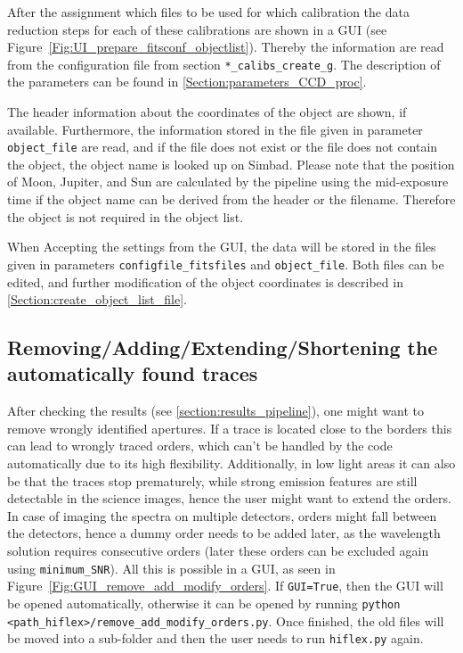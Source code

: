 \documentclass[10pt,a4paper]{article}
\begin{document}
After the assignment which files to be used for which calibration the data reduction steps for each of these calibrations are shown in a GUI (see Figure~\ref{Fig:UI_prepare_fitsconf_objectlist}). Thereby the information are read from the configuration file from section \verb|*_calibs_create_g|. The description of the parameters can be found in \ref{Section:parameters_CCD_proc}.

\noindent The header information about the coordinates of the object are shown, if available. Furthermore, the information stored in the file given in parameter \verb|object_file| are read, and if the file does not exist or the file does not contain the object, the object name is looked up on Simbad. Please note that the position of Moon, Jupiter, and Sun are calculated by the pipeline using the mid-exposure time if the object name can be derived from the header or the filename. Therefore the object is not required in the object list.

\noindent When Accepting the settings from the GUI, the data will be stored in the files given in parameters \verb|configfile_fitsfiles| and \verb|object_file|. Both files can be edited, and further modification of the object coordinates is described in \ref{Section:create_object_list_file}.


\subsection{Removing/Adding/Extending/Shortening the automatically found traces}
\label{Sec:remove_add_modify_orders}

After checking the results (see \ref{section:results_pipeline}), one might want to remove wrongly identified apertures. If a trace is located close to the borders this can lead to wrongly traced orders, which can't be handled by the code automatically due to its high flexibility. Additionally, in low light areas it can also be that the traces stop prematurely, while strong emission features are still detectable in the science images, hence the user might want to extend the orders. In case of imaging the spectra on multiple detectors, orders might fall between the detectors, hence a dummy order needs to be added later, as the wavelength solution requires consecutive orders (later these orders can be excluded again using \verb|minimum_SNR|). All this is possible in a GUI, as seen in Figure~\ref{Fig:GUI_remove_add_modify_orders}. If \verb|GUI=True|, then the GUI will be opened automatically, otherwise it can be opened by running \verb|python <path_hiflex>/remove_add_modify_orders.py|. Once finished, the old files will be moved into a sub-folder and then the user needs to run \verb|hiflex.py| again.
\end{document}
